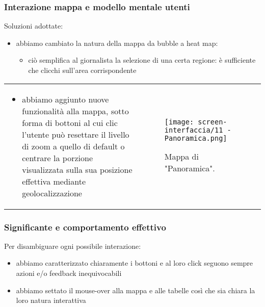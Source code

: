 \begin{frame}
    \frametitle{Interazione mappa e modello mentale utenti}
    \label{f:mappa}
    Soluzioni adottate: 
    \begin{itemize}
        \item abbiamo cambiato la natura della mappa da bubble a heat map:
        \begin{itemize}
            \item ciò semplifica al giornalista la selezione di una certa regione: è sufficiente che clicchi sull'area corrispondente
        \end{itemize}
    \end{itemize}
    \hspace{-8pt}
    \begin{tabular}{p{}p{}}    
        \begin{itemize}
            \item abbiamo aggiunto nuove funzionalità alla mappa, sotto forma di bottoni al cui clic l'utente può resettare il livello di zoom a quello di default o centrare la porzione visualizzata sulla sua posizione effettiva mediante geolocalizzazione
        \end{itemize} &
            
        \begin{figure}
            \centering
            \vspace{-20pt}
            \texttt{[image: screen-interfaccia/11 - Panoramica.png]}
            \caption{Mappa di "Panoramica".}
        \end{figure} \\

    \end{tabular}   

\end{frame}


\begin{frame}
    \frametitle{Significante e comportamento effettivo}
    \label{f:significante}
    Per disambiguare ogni possibile interazione:
    \begin{itemize}
        \item<1-> abbiamo caratterizzato chiaramente i bottoni e al loro click seguono sempre azioni e/o feedback inequivocabili
        \item<2-> abbiamo settato il mouse-over alla mappa e alle tabelle così che sia chiara la loro natura interattiva
    \end{itemize}
\end{frame}

